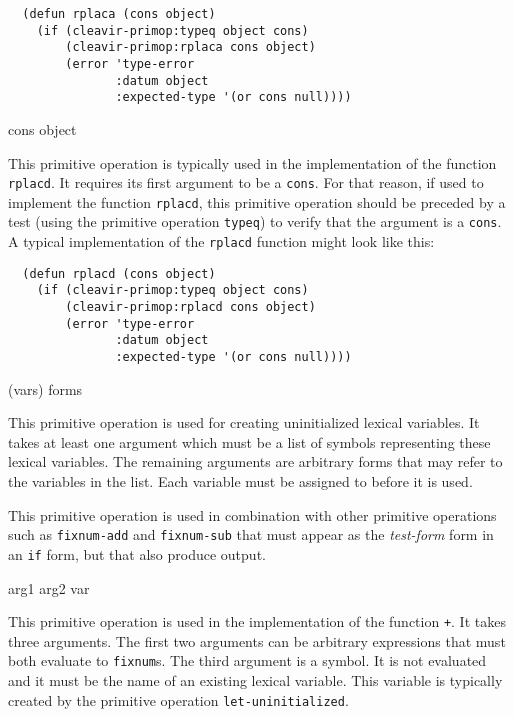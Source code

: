 \begin{verbatim}
  (defun rplaca (cons object)
    (if (cleavir-primop:typeq object cons)
        (cleavir-primop:rplaca cons object)
        (error 'type-error
               :datum object
               :expected-type '(or cons null))))
\end{verbatim}

 {cons object}

This primitive operation is typically used in the implementation of
the \commonlisp{} function \texttt{rplacd}.  It requires its first
argument to be a \texttt{cons}.  For that reason, if used to implement
the \commonlisp{} function \texttt{rplacd}, this primitive operation
should be preceded by a test (using the primitive operation
\texttt{typeq}) to verify that the argument is a \texttt{cons}.  A
typical implementation of the \texttt{rplacd} function might look like
this:

\begin{verbatim}
  (defun rplacd (cons object)
    (if (cleavir-primop:typeq object cons)
        (cleavir-primop:rplacd cons object)
        (error 'type-error
               :datum object
               :expected-type '(or cons null))))
\end{verbatim}

 {(\rest vars) \body forms}

This primitive operation is used for creating uninitialized lexical
variables.  It takes at least one argument which must be a list of
symbols representing these lexical variables.  The remaining arguments
are arbitrary forms that may refer to the variables in the list.  Each
variable must be assigned to before it is used.

This primitive operation is used in combination with other primitive
operations such as \texttt{fixnum-add} and \texttt{fixnum-sub} that
must appear as the \emph{test-form} form in an \texttt{if} form, but
that also produce output.

 {arg1 arg2 var}

This primitive operation is used in the implementation of the
\commonlisp{} function \texttt{+}.  It takes three arguments.  The
first two arguments can be arbitrary expressions that must both
evaluate to \texttt{fixnum}s.   The third argument is a symbol.  It is
not evaluated and it must be the name of an existing lexical
variable.  This variable is typically created by the primitive
operation \texttt{let-uninitialized}.

